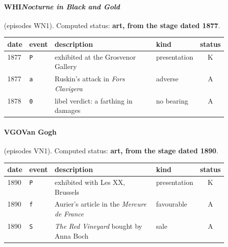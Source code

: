 \paragraph{WHI\enspace \emph{Nocturne in Black and Gold}} (episodes WN1). Computed status: \textbf{art, from the stage dated 1877}.
\begin{center}\footnotesize\begin{tabular}{@{}llp{0.52\linewidth}lc@{}}
date & event & description & kind & status \\ \midrule
1877 & \texttt{P} & exhibited at the Grosvenor Gallery & presentation & K \\
1877 & \texttt{a} & Ruskin's attack in \emph{Fors Clavigera} & adverse & A \\
1878 & \texttt{0} & libel verdict: a farthing in damages & no bearing & A \\
\end{tabular}\end{center}

\paragraph{VGO\enspace Van Gogh} (episodes VN1). Computed status: \textbf{art, from the stage dated 1890}.
\begin{center}\footnotesize\begin{tabular}{@{}llp{0.52\linewidth}lc@{}}
date & event & description & kind & status \\ \midrule
1890 & \texttt{P} & exhibited with Les XX, Brussels & presentation & K \\
1890 & \texttt{f} & Aurier's article in the \emph{Mercure de France} & favourable & A \\
1890 & \texttt{S} & \emph{The Red Vineyard} bought by Anna Boch & sale & A \\
\end{tabular}\end{center}

